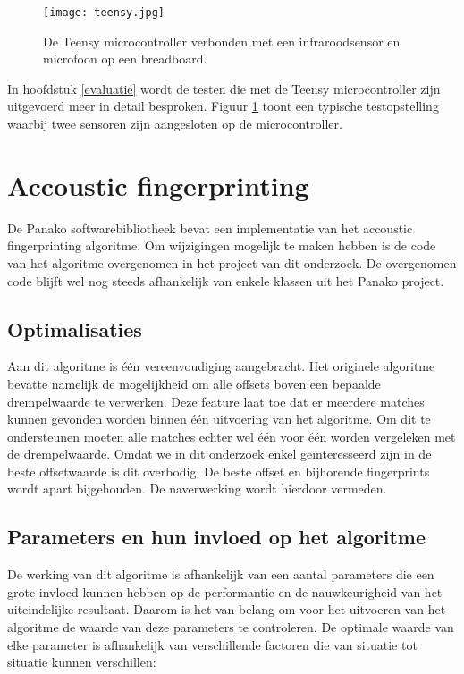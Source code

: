 \begin{figure}[!h]
	\captionsetup{width=0.7\textwidth}
	\caption[Teensy microcontroller]{De Teensy microcontroller verbonden met een infraroodsensor en microfoon op een breadboard.}
	\centering
	\advance\parskip0.3cm
	\texttt{[image: teensy.jpg]}
	\label{teensy-pic}
\end{figure}

In hoofdstuk \ref{evaluatie} wordt de testen die met de Teensy microcontroller zijn uitgevoerd meer in detail besproken. Figuur \ref{teensy-pic} toont een typische testopstelling waarbij twee sensoren zijn aangesloten op de microcontroller.

\section{Accoustic fingerprinting}

De Panako softwarebibliotheek bevat een implementatie van het accoustic fingerprinting algoritme. Om wijzigingen mogelijk te maken hebben is de code van het algoritme overgenomen in het project van dit onderzoek. De overgenomen code blijft wel nog steeds afhankelijk van enkele klassen uit het Panako project. 

\subsection{Optimalisaties}

Aan dit algoritme is één vereenvoudiging aangebracht. Het originele algoritme bevatte namelijk de mogelijkheid om alle offsets boven een bepaalde drempelwaarde te verwerken. Deze feature laat toe dat er meerdere matches kunnen gevonden worden binnen één uitvoering van het algoritme. Om dit te ondersteunen moeten alle matches echter wel één voor één worden vergeleken met de drempelwaarde. Omdat we in dit onderzoek enkel geïnteresseerd zijn in de beste offsetwaarde is dit overbodig. De beste offset en bijhorende fingerprints wordt apart bijgehouden. De naverwerking wordt hierdoor vermeden.

\subsection{Parameters en hun invloed op het algoritme}
\label{accoustic-fingerprinting-params}

De werking van dit algoritme is afhankelijk van een aantal parameters die een grote invloed kunnen hebben op de performantie en de nauwkeurigheid van het uiteindelijke resultaat. Daarom is het van belang om voor het uitvoeren van het algoritme de waarde van deze parameters te controleren. De optimale waarde van elke parameter is afhankelijk van verschillende factoren die van situatie tot situatie kunnen verschillen:


